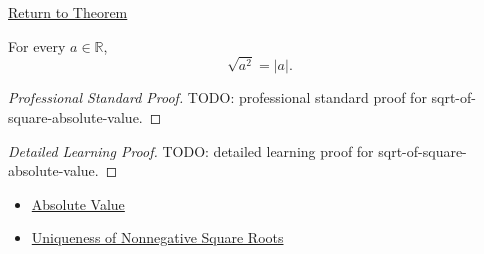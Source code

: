 \newpage
{}
\label{prf:sqrt-of-square-absolute-value}

\begin{remark*}[Return]
\hyperref[thm:sqrt-of-square-absolute-value]{Return to Theorem}
\end{remark*}

\begin{theorem*}
For every $a\in\mathbb{R}$,
\[
\sqrt{a^2}=|a|.
\]
\end{theorem*}

\begin{proof}[Professional Standard Proof]
\LRAProofBodyStart
TODO: professional standard proof for sqrt-of-square-absolute-value.
\end{proof}

\begin{proof}[Detailed Learning Proof]
\LRAProofBodyStart
TODO: detailed learning proof for sqrt-of-square-absolute-value.
\end{proof}

\begin{remark*}
\end{remark*}

\begin{dependencies}
\begin{itemize}
  \item \hyperref[def:absolute-value]{Absolute Value}
  \item \hyperref[thm:uniqueness-of-nonnegative-square-roots]{Uniqueness of Nonnegative Square Roots}
\end{itemize}
\end{dependencies}

\clearpage
